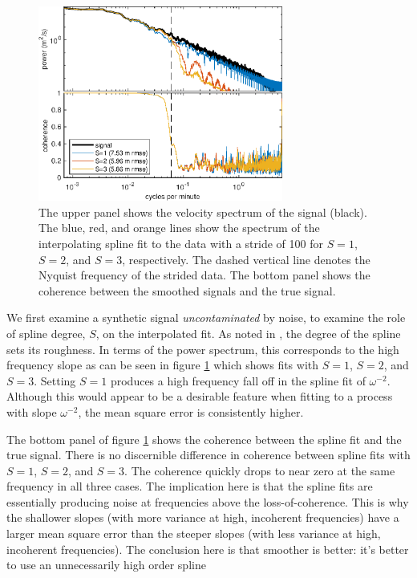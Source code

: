 \documentclass[10pt,journal]{IEEEtran}
\begin{document}
\begin{figure}
  \centerline{\includegraphics[width=19pc,angle=0]{figures/interpolation_spectrum_slope2degreeVaried}}
  
  \caption{The upper panel shows the velocity spectrum of the signal (black). The blue, red, and orange lines show the spectrum of the interpolating spline fit to the data with a stride of 100 for $S=1$, $S=2$, and $S=3$, respectively. The dashed vertical line denotes the Nyquist frequency of the strided data. The bottom panel shows the coherence between the smoothed signals and the true signal.}
  \label{varied_slope}
\end{figure}

We first examine a synthetic signal \emph{uncontaminated} by noise, to examine the role of spline degree, $S$, on the interpolated fit. As noted in \cite{craven1979-nm}, the degree of the spline sets its roughness. In terms of the power spectrum, this corresponds to the high frequency slope as can be seen in figure \ref{varied_slope} which shows fits with $S=1$, $S=2$, and $S=3$. Setting $S=1$ produces a high frequency fall off in the spline fit of $\omega^{-2}$. Although this would appear to be a desirable feature when fitting to a process with slope $\omega^{-2}$, the mean square error is consistently higher.

The bottom panel of figure \ref{varied_slope} shows the coherence between the spline fit and the true signal. There is no discernible difference in coherence between spline fits with $S=1$, $S=2$, and $S=3$. The coherence quickly drops to near zero at the same frequency in all three cases. The implication here is that the spline fits are essentially producing noise at frequencies above the loss-of-coherence. This is why the shallower slopes (with more variance at high, incoherent frequencies) have a larger mean square error than the steeper slopes (with less variance at high, incoherent frequencies). The conclusion here is that smoother is better: it's better to use an unnecessarily high order spline
\end{document}
